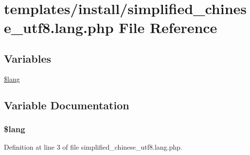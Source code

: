 \hypertarget{templates_2install_2simplified__chinese__utf8_8lang_8php}{\section{templates/install/simplified\+\_\+chinese\+\_\+utf8.lang.\+php File Reference}
\label{templates_2install_2simplified__chinese__utf8_8lang_8php}
}
\subsection*{Variables}
\begin{DoxyCompactItemize}
\item 
\hyperlink{templates_2install_2simplified__chinese__utf8_8lang_8php_a7714b111b644017933931ec69a154102}{\$lang}
\end{DoxyCompactItemize}


\subsection{Variable Documentation}
\hypertarget{templates_2install_2simplified__chinese__utf8_8lang_8php_a7714b111b644017933931ec69a154102}{
\subsubsection[{\$lang}]{\setlength{\rightskip}{0pt plus 5cm}\$lang}}\label{templates_2install_2simplified__chinese__utf8_8lang_8php_a7714b111b644017933931ec69a154102}


Definition at line 3 of file simplified\+\_\+chinese\+\_\+utf8.\+lang.\+php.

